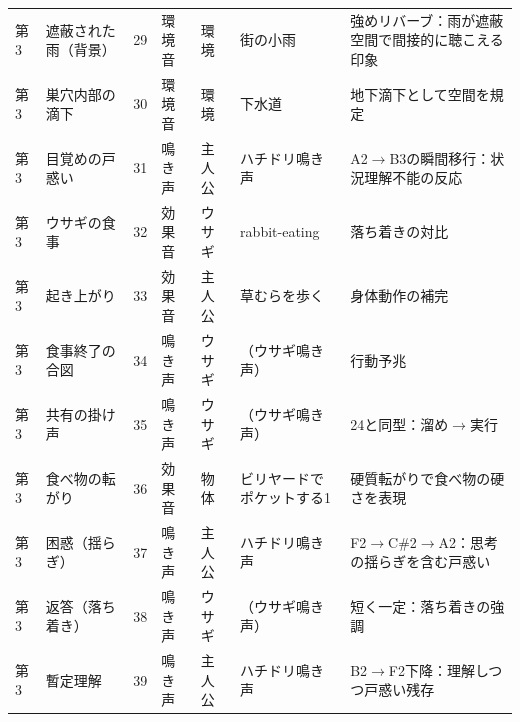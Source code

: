 \begin{longtable}{p{0.6cm} p{2.8cm} p{1.6cm} p{1.5cm} p{1.5cm} p{3.0cm} p{4.1cm}}
	第3          & 遮蔽された雨（背景）           & 29                      & 環境音         & 環境            & 街の小雨                                      & 強めリバーブ：雨が遮蔽空間で間接的に聴こえる印象                     \\
	第3          & 巣穴内部の滴下              & 30                      & 環境音         & 環境            & 下水道                                       & 地下滴下として空間を規定                                 \\
	第3          & 目覚めの戸惑い              & 31                      & 鳴き声         & 主人公           & ハチドリ鳴き声                                   & A2$\to$B3の瞬間移行：状況理解不能の反応                     \\
	第3          & ウサギの食事               & 32                      & 効果音         & ウサギ           & rabbit-eating                             & 落ち着きの対比                                      \\
	第3          & 起き上がり                & 33                      & 効果音         & 主人公           & 草むらを歩く                                    & 身体動作の補完                                      \\
	第3          & 食事終了の合図              & 34                      & 鳴き声         & ウサギ           & （ウサギ鳴き声）                                  & 行動予兆                                         \\
	第3          & 共有の掛け声               & 35                      & 鳴き声         & ウサギ           & （ウサギ鳴き声）                                  & 24と同型：溜め$\to$実行                              \\
	第3          & 食べ物の転がり              & 36                      & 効果音         & 物体            & ビリヤードでポケットする1                             & 硬質転がりで食べ物の硬さを表現                              \\
	第3          & 困惑（揺らぎ）              & 37                      & 鳴き声         & 主人公           & ハチドリ鳴き声                                   & F2$\to$C\#2$\to$A2：思考の揺らぎを含む戸惑い              \\
	第3          & 返答（落ち着き）             & 38                      & 鳴き声         & ウサギ           & （ウサギ鳴き声）                                  & 短く一定：落ち着きの強調                                 \\
	第3          & 暫定理解                 & 39                      & 鳴き声         & 主人公           & ハチドリ鳴き声                                   & B2$\to$F2下降：理解しつつ戸惑い残存                       \\

\end{longtable}
